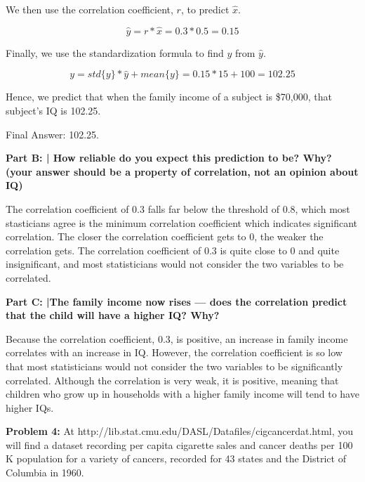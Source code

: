 \documentclass{article}
\begin{document}
 We then use the correlation coefficient, $r$, to predict $\hat{x}$.
 
 \begin{displaymath}
    \hat{y} = r*\hat{x} = 0.3 * 0.5 = 0.15 
 \end{displaymath}
 
 Finally, we use the standardization formula to find $y$ from $\hat{y}$.
 
 \begin{displaymath}
    y = std\{y\}*\hat{y} + mean\{y\} = 0.15 * 15 + 100 = 102.25
 \end{displaymath}
 
 Hence, we predict that when the family income of a subject is \$70,000, that subject's IQ is 102.25.\newline
 
 Final Answer: 102.25.\newline
 
 \textbf{Part B: | How reliable do you expect this prediction to be? Why? (your answer should be a property of correlation, not an opinion
about IQ)}\newline
 
 The correlation coefficient of 0.3 falls far below the threshold of 0.8, which most stasticians agree is the minimum correlation coefficient which indicates significant correlation. The closer the correlation coefficient gets to 0, the weaker the correlation gets. The correlation coefficient of 0.3 is quite close to 0 and quite insignificant, and most statisticians would not consider the two variables to be correlated. \newline
 
 \textbf{Part C: |The family income now rises — does the correlation predict that the child will have a higher IQ? Why?}\newline
 
 Because the correlation coefficient, 0.3, is positive, an increase in family income correlates with an increase in IQ. However, the correlation coefficient is so low that most statisticians would not consider the two variables to be significantly correlated. Although the correlation is very weak, it is positive, meaning that children who grow up in households with a higher family income will tend to have higher IQs. \newline
 
 \newpage
 
 \begin{center}
      \Large\textbf{Problem 4:} At http://lib.stat.cmu.edu/DASL/Datafiles/cigcancerdat.html, you will find a dataset recording per capita cigarette sales and cancer deaths per 100 K population for a variety of cancers, recorded for 43 states and the District of Columbia in 1960.\par
 \end{center}
\end{document}
